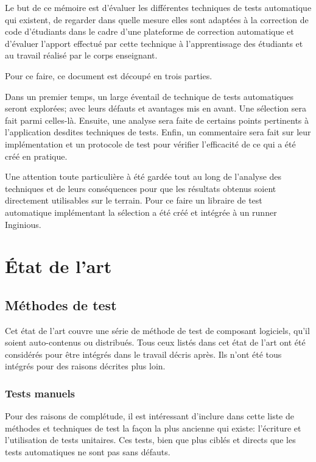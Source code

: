 \documentclass[a4paper]{report}
\begin{document}
Le but de ce mémoire est d'évaluer les différentes techniques de tests automatique qui existent, de regarder dans quelle mesure elles sont adaptées à la correction de code d'étudiants dans le cadre d'une plateforme de correction automatique et d'évaluer l'apport effectué par cette technique à l'apprentissage des étudiants et au travail réalisé par le corps enseignant.

Pour ce faire, ce document est découpé en trois parties.

Dans un premier temps, un large éventail de technique de tests automatiques seront explorées; avec leurs défauts et avantages mis en avant.
Une sélection sera fait parmi celles-là.
Ensuite, une analyse sera faite de certains points pertinents à l'application desdites techniques de tests.
Enfin, un commentaire sera fait sur leur implémentation et un protocole de test pour vérifier l'efficacité de ce qui a été créé en pratique.

Une attention toute particulière à été gardée tout au long de l'analyse des techniques et de leurs conséquences pour que les résultats obtenus soient directement utilisables sur le terrain.
Pour ce faire un libraire de test automatique implémentant la sélection a été créé et intégrée à un runner Inginious.


\chapter{État de l'art}


\section{Méthodes de test}
Cet état de l'art couvre une série de méthode de test de composant logiciels, qu'il soient auto-contenus ou distribués.
Tous ceux listés dans cet état de l'art ont été considérés pour être intégrés dans le travail décris après.
Ils n'ont été tous intégrés pour des raisons décrites plus loin.


\subsection{Tests manuels}

Pour des raisons de complétude, il est intéressant d’inclure dans cette liste de méthodes et techniques de test la façon la plus ancienne qui existe: l’écriture et l’utilisation de tests unitaires.
Ces tests, bien que plus ciblés et directs que les tests automatiques ne sont pas sans défauts.
\end{document}
